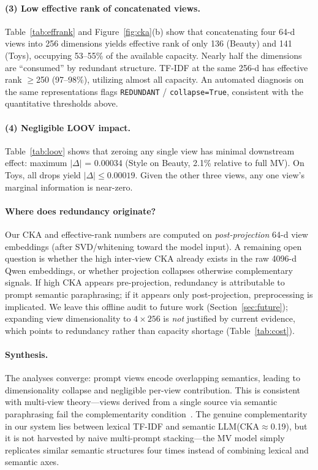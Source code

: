 \documentclass[sigconf,natbib=true,anonymous]{acmart}
\newcommand{\tfidf}{\textsc{TF-IDF}\xspace}
\newcommand{\llm}{\textsc{LLM}\xspace}
\begin{document}
\paragraph{(3) Low effective rank of concatenated views.}
Table~\ref{tab:effrank} and Figure~\ref{fig:cka}(b) show that concatenating four 64-d views into 256 dimensions yields effective rank of only 136 (Beauty) and 141 (Toys), occupying 53--55\% of the available capacity.
Nearly half the dimensions are ``consumed'' by redundant structure.
TF-IDF at the same 256-d has effective rank $\ge$250 (97--98\%), utilizing almost all capacity.
An automated diagnosis on the same representations flags \texttt{REDUNDANT} / \texttt{collapse=True}, consistent with the quantitative thresholds above.

\paragraph{(4) Negligible LOOV impact.}
Table~\ref{tab:loov} shows that zeroing any single view has minimal downstream effect: maximum $|\Delta|$ = 0.00034 (Style on Beauty, 2.1\% relative to full MV).
On Toys, all drops yield $|\Delta| \le 0.00019$.
Given the other three views, any one view's marginal information is near-zero.

\paragraph{Where does redundancy originate?}
Our CKA and effective-rank numbers are computed on \emph{post-projection} 64-d view embeddings (after SVD/whitening toward the model input).
A remaining open question is whether the high inter-view CKA already exists in the raw 4096-d Qwen embeddings, or whether projection collapses otherwise complementary signals.
If high CKA appears pre-projection, redundancy is attributable to prompt semantic paraphrasing; if it appears only post-projection, preprocessing is implicated.
We leave this offline audit to future work (Section~\ref{sec:future}); expanding view dimensionality to $4\times256$ is \emph{not} justified by current evidence, which points to redundancy rather than capacity shortage (Table~\ref{tab:cost}).

\paragraph{Synthesis.}
The analyses converge: prompt views encode overlapping semantics, leading to dimensionality collapse and negligible per-view contribution.
This is consistent with multi-view theory---views derived from a single source via semantic paraphrasing fail the complementarity condition~\cite{xu2013multiview}.
The genuine complementarity in our system lies between lexical \tfidf and semantic \llm (CKA$\approx$0.19), but it is not harvested by naive multi-prompt stacking---the MV model simply replicates similar semantic structures four times instead of combining lexical and semantic axes.
\end{document}
